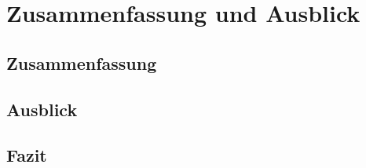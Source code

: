 \chapter{Zusammenfassung und Ausblick}
    \label{chapter:SummaryAndOutlook}

    \section{Zusammenfassung}
    \section{Ausblick}
    \section{Fazit}